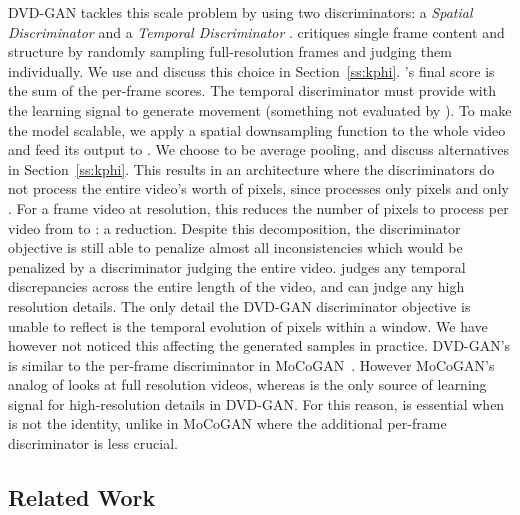 \documentclass{article} \usepackage{iclr2020_conference,times}
\begin{document}
DVD-GAN tackles this scale problem by using two discriminators: a \textit{Spatial Discriminator}  and a \textit{Temporal Discriminator} .   critiques single frame content and structure by randomly sampling  full-resolution frames and judging them individually. We use  and discuss this choice in Section~\ref{ss:kphi}. 's final score is the sum of the per-frame scores. The temporal discriminator  must provide  with the learning signal to generate movement (something not evaluated by ).
To make the model scalable, we apply a spatial downsampling function  to the whole video and feed its output to . We choose  to be  average pooling, and discuss alternatives in Section~\ref{ss:kphi}. This results in an architecture where the discriminators do not process the entire video's worth of pixels, since  processes only  pixels and  only . For a  frame video at  resolution, this reduces the number of pixels to process per video from  to : a  reduction.
Despite this decomposition, the discriminator objective is still able to penalize almost all inconsistencies which would be penalized by a discriminator judging the entire video.  judges any temporal discrepancies across the entire length of the video, and  can judge any high resolution details. The only detail the DVD-GAN discriminator objective is unable to reflect is the temporal evolution of pixels within a  window.
We have however not noticed this affecting the generated samples in practice.
DVD-GAN's  is similar to the per-frame discriminator  in MoCoGAN~\citep{tulyakov2018mocogan}. However MoCoGAN's analog of  looks at full resolution videos, whereas  is the only source of learning signal for high-resolution details in DVD-GAN. For this reason,  is essential when  is not the identity, unlike in MoCoGAN where the additional per-frame discriminator is less crucial.

\subsection{Related Work}
\label{s:rw}
\end{document}
